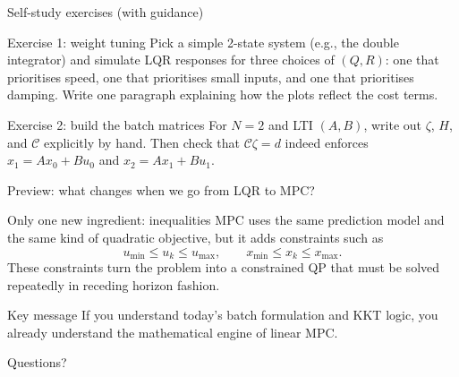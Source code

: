 \documentclass[aspectratio=169,11pt]{beamer}
\begin{document}
\begin{frame}{Self-study exercises (with guidance)}
\begin{block}{Exercise 1: weight tuning}
Pick a simple 2-state system (e.g., the double integrator) and simulate LQR responses for three choices of $(Q,R)$:
one that prioritises speed, one that prioritises small inputs, and one that prioritises damping.
Write one paragraph explaining how the plots reflect the cost terms.
\end{block}

\begin{block}{Exercise 2: build the batch matrices}
For $N=2$ and LTI $(A,B)$, write out $\zeta$, $H$, and $\mathcal{C}$ explicitly by hand.
Then check that $\mathcal{C}\zeta=d$ indeed enforces $x_1=Ax_0+Bu_0$ and $x_2=Ax_1+Bu_1$.
\end{block}
\end{frame}

\begin{frame}{Preview: what changes when we go from LQR to MPC?}
\begin{block}{Only one new ingredient: inequalities}
MPC uses the same prediction model and the same kind of quadratic objective, but it adds constraints such as
\[
u_{\min}\le u_k\le u_{\max},\qquad x_{\min}\le x_k\le x_{\max}.
\]
These constraints turn the problem into a constrained QP that must be solved repeatedly in receding horizon fashion.
\end{block}

\begin{alertblock}{Key message}
If you understand today's batch formulation and KKT logic, you already understand the mathematical engine of linear MPC.
\end{alertblock}
\end{frame}

\begin{frame}
\centering
\Huge Questions?
\end{frame}
\end{document}
